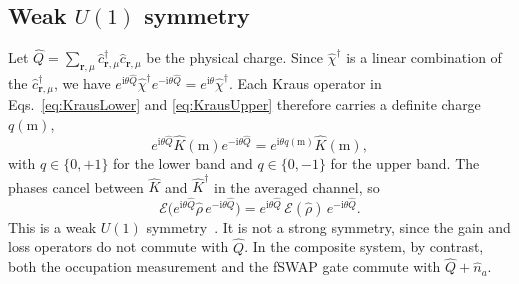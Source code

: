 \documentclass[aps,prb,10pt,twocolumn,superscriptaddress,longbibliography,floatfix]{revtex4-2}
\newcommand{\ii}{\mathrm{i}}
\newcommand{\mc}[1]{\mathcal{#1}}
\newcommand{\bfr}{\boldsymbol r}
\begin{document}
\subsection{Weak \texorpdfstring{$U(1)$}{U(1)} symmetry}

Let $\hat Q=\sum_{\bfr,\mu}\hat c^\dagger_{\bfr,\mu}\hat c_{\bfr,\mu}$ be the physical charge. Since $\hat\chi^\dagger$ is a linear combination of the $\hat c^\dagger_{\bfr,\mu}$, we have $e^{\ii\theta\hat Q}\hat\chi^\dagger e^{-\ii\theta\hat Q}=e^{\ii\theta}\hat\chi^\dagger$. Each Kraus operator in Eqs.~\eqref{eq:KrausLower} and \eqref{eq:KrausUpper} therefore carries a definite charge $q(\mathrm{m})$,
\begin{equation}
    e^{\ii\theta\hat Q}\hat K(\mathrm{m})e^{-\ii\theta\hat Q}=e^{\ii\theta q(\mathrm{m})}\hat K(\mathrm{m}),
    \label{eq:KrausCharge}
\end{equation}
with $q\in\{0,+1\}$ for the lower band and $q\in\{0,-1\}$ for the upper band. The phases cancel between $\hat K$ and $\hat K^\dagger$ in the averaged channel, so
\begin{equation}
    \mc E\big(e^{\ii\theta\hat Q}\hat\rho\,e^{-\ii\theta\hat Q}\big)=e^{\ii\theta\hat Q}\,\mc E(\hat\rho)\,e^{-\ii\theta\hat Q}.
    \label{eq:WeakU1}
\end{equation}
This is a weak $U(1)$ symmetry~\cite{BucaProsen2012,AlbertJiang2014}. It is not a strong symmetry, since the gain and loss operators do not commute with $\hat Q$. In the composite system, by contrast, both the occupation measurement and the fSWAP gate commute with $\hat Q+\hat n_a$.
\end{document}
